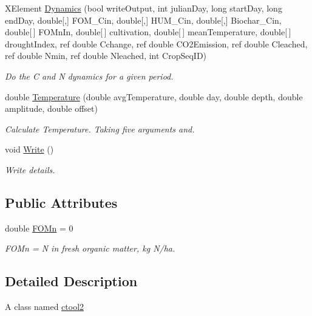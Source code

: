 \begin{DoxyCompactItemize}
X\+Element \mbox{\hyperlink{classctool2_a9443a20fe2c0134438a7e03c9821cee0}{Dynamics}} (bool write\+Output, int julian\+Day, long start\+Day, long end\+Day, double\mbox{[},\mbox{]} F\+O\+M\+\_\+\+Cin, double\mbox{[},\mbox{]} H\+U\+M\+\_\+\+Cin, double\mbox{[},\mbox{]} Biochar\+\_\+\+Cin, double\mbox{[}$\,$\mbox{]} F\+O\+Mn\+In, double\mbox{[}$\,$\mbox{]} cultivation, double\mbox{[}$\,$\mbox{]} mean\+Temperature, double\mbox{[}$\,$\mbox{]} drought\+Index, ref double Cchange, ref double C\+O2\+Emission, ref double Cleached, ref double Nmin, ref double Nleached, int Crop\+Seq\+ID)
\begin{DoxyCompactList}\small\item\em Do the C and N dynamics for a given period. \end{DoxyCompactList}\item 
double \mbox{\hyperlink{classctool2_af3b775757402d284e18dcf32a95f9e40}{Temperature}} (double avg\+Temperature, double day, double depth, double amplitude, double offset)
\begin{DoxyCompactList}\small\item\em Calculate Temperature. Taking five arguments and. \end{DoxyCompactList}\item 
void \mbox{\hyperlink{classctool2_adc4e483898d5c40908e45b1daab820b3}{Write}} ()
\begin{DoxyCompactList}\small\item\em Write details. \end{DoxyCompactList}\end{DoxyCompactItemize}
\subsection*{Public Attributes}
\begin{DoxyCompactItemize}
\item 
double \mbox{\hyperlink{classctool2_a2a658e8bff396aa74f6ce46404bd7121}{F\+O\+Mn}} = 0
\begin{DoxyCompactList}\small\item\em F\+O\+Mn = N in fresh organic matter, kg N/ha. \end{DoxyCompactList}\end{DoxyCompactItemize}


\subsection{Detailed Description}
A class named \mbox{\hyperlink{classctool2}{ctool2}}


